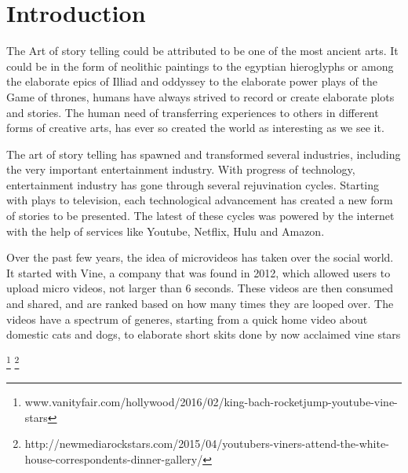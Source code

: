 \section{Introduction}
The Art of story telling could be attributed to be one of the most ancient arts. It could be in the form of neolithic paintings to the egyptian hieroglyphs or among the elaborate epics of Illiad and oddyssey to the elaborate power plays of the Game of thrones, humans have always strived to record or create elaborate plots and stories. The human need of transferring experiences to others in different forms of creative arts, has ever so created the world as interesting as we see it. 
\par
The art of story telling has spawned and transformed several industries, including the very important entertainment industry. With progress of technology, entertainment industry has gone through several rejuvination cycles. Starting with plays to television, each technological advancement has created a new form of stories to be presented. The latest of these cycles was powered by the internet with the help of services like Youtube, Netflix, Hulu and Amazon. 

\par
Over the past few years, the idea of microvideos has taken over the social world. It started with Vine, a company that was found in 2012, which allowed users to upload micro videos, not larger than 6 seconds. These videos are then consumed and shared, and are ranked based on how many times they are looped over. The videos have a spectrum of generes, starting from a quick home video about domestic cats and dogs, to elaborate short skits done by now acclaimed vine stars 

\footnote{www.vanityfair.com/hollywood/2016/02/king-bach-rocketjump-youtube-vine-stars}
\footnote{http://newmediarockstars.com/2015/04/youtubers-viners-attend-the-white-house-correspondents-dinner-gallery/}